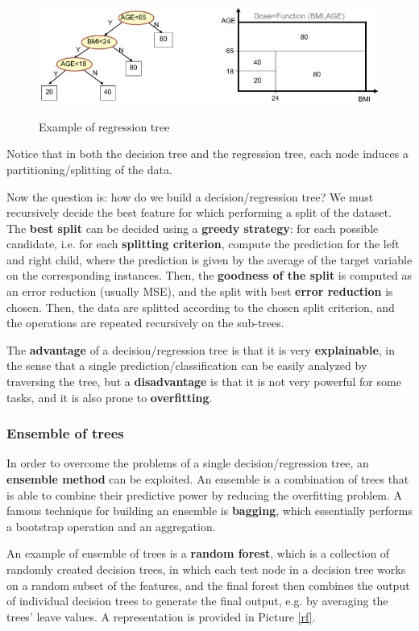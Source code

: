 \begin{figure}[h!]
		\centering
        \includegraphics[scale = 1.8]{img/regression tree.jpg}
		\label{rt}
        \caption{Example of regression tree}
\end{figure}

Notice that in both the decision tree and the regression tree, each node induces a partitioning/splitting of the data.

Now the question is: how do we build a decision/regression tree? We must recursively decide the best feature for which performing a split of the dataset. The \textbf{best split} can be decided using a \textbf{greedy strategy}: for each possible candidate, i.e. for each \textbf{splitting criterion}, compute the prediction for the left and right child, where the prediction is given by the average of the target variable on the corresponding instances. Then, the \textbf{goodness of the split} is computed as an error reduction (usually MSE), and the split with best \textbf{error reduction} is chosen. Then, the data are splitted according to the chosen split criterion, and the operations are repeated recursively on the sub-trees.

The \textbf{advantage} of a decision/regression tree is that it is very \textbf{explainable}, in the sense that a single prediction/classification can be easily analyzed by traversing the tree, but a \textbf{disadvantage} is that it is not very powerful for some tasks, and it is also prone to \textbf{overfitting}.

\subsubsection{Ensemble of trees}
In order to overcome the problems of a single decision/regression tree, an \textbf{ensemble method} can be exploited. An ensemble is a combination of trees that is able to combine their predictive power by reducing the overfitting problem. A famous technique for building an ensemble is \textbf{bagging}, which essentially performs a bootstrap operation and an aggregation.

An example of ensemble of trees is a \textbf{random forest}, which is a collection of randomly created decision trees, in which each test node in a decision tree works on a random subset of the features, and the final forest then combines the output of individual decision trees to generate the final output, e.g. by averaging the trees' leave values. A representation is provided in Picture \ref{rf}.

